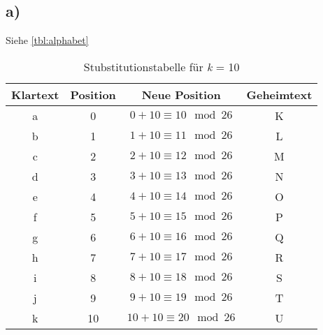 \documentclass[10pt,a4paper]{article}
\begin{document}
\subsection*{a)}
Siehe \ref{tbl:alphabet}
\begin{table}[htdp]
\caption{Stubstitutionstabelle für \textsl{k} = 10}
\begin{center}
\begin{tabular}{|c|c|c|c|}
	Klartext & Position & Neue Position & Geheimtext\\ \hline
	a & 0 & \begin{math} 0 + 10 \equiv 10 \mod 26\end{math} & K \\ \hline
	b & 1 & \begin{math} 1 + 10 \equiv 11 \mod 26 \end{math} & L \\ \hline
	c & 2 & \begin{math} 2 + 10  \equiv 12  \mod 26 \end{math} & M \\ \hline
	d & 3 & \begin{math} 3 + 10  \equiv 13 \mod 26 \end{math}  & N \\ \hline
	e & 4 & \begin{math} 4 + 10 \equiv 14 \mod 26 \end{math}  & O \\ \hline
	f & 5 & \begin{math} 5 + 10 \equiv 15 \mod 26 \end{math}   & P \\ \hline
	g & 6 & \begin{math} 6 + 10 \equiv 16 \mod 26 \end{math}  & Q \\ \hline
	h & 7 & \begin{math} 7 + 10 \equiv 17 \mod 26 \end{math}  & R \\ \hline
	i & 8 & \begin{math} 8 + 10 \equiv 18 \mod 26 \end{math} & S \\ \hline
	j & 9 & \begin{math} 9 + 10 \equiv 19 \mod 26 \end{math}   & T \\ \hline
	k & 10 & \begin{math} 10 + 10 \equiv 20 \mod 26 \end{math}  & U \\ \hline

\end{tabular}
\end{center}
\end{table}
\end{document}
